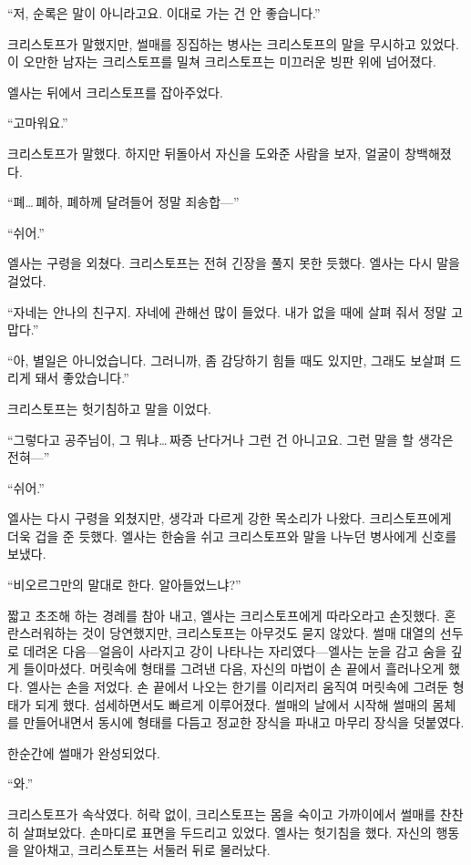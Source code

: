 ``저, 순록은 말이 아니라고요. 이대로 가는 건 안 좋습니다.''

크리스토프가 말했지만, 썰매를 징집하는 병사는 크리스토프의 말을 무시하고 있었다. 이 오만한 남자는 크리스토프를 밀쳐 크리스토프는 미끄러운 빙판 위에 넘어졌다.

엘사는 뒤에서 크리스토프를 잡아주었다.

``고마워요.''

크리스토프가 말했다. 하지만 뒤돌아서 자신을 도와준 사람을 보자, 얼굴이 창백해졌다.

``폐\ldots\,폐하, 폐하께 달려들어 정말 죄송합—''

``쉬어.''

엘사는 구령을 외쳤다. 크리스토프는 전혀 긴장을 풀지 못한 듯했다. 엘사는 다시 말을 걸었다.

``자네는 안나의 친구지. 자네에 관해선 많이 들었다. 내가 없을 때에 살펴 줘서 정말 고맙다.''

``아, 별일은 아니었습니다. 그러니까, 좀 감당하기 힘들 때도 있지만, 그래도 보살펴 드리게 돼서 좋았습니다.''

크리스토프는 헛기침하고 말을 이었다.

``그렇다고 공주님이, 그 뭐냐\ldots\,짜증 난다거나 그런 건 아니고요. 그런 말을 할 생각은 전혀—''

``쉬어.''

엘사는 다시 구령을 외쳤지만, 생각과 다르게 강한 목소리가 나왔다. 크리스토프에게 더욱 겁을 준 듯했다. 엘사는 한숨을 쉬고 크리스토프와 말을 나누던 병사에게 신호를 보냈다.

``비오르그만의 말대로 한다. 알아들었느냐?''

짧고 초조해 하는 경례를 참아 내고, 엘사는 크리스토프에게 따라오라고 손짓했다. 혼란스러워하는 것이 당연했지만, 크리스토프는 아무것도 묻지 않았다. 썰매 대열의 선두로 데려온 다음—얼음이 사라지고 강이 나타나는 자리였다—엘사는 눈을 감고 숨을 깊게 들이마셨다. 머릿속에 형태를 그려낸 다음, 자신의 마법이 손 끝에서 흘러나오게 했다. 엘사는 손을 저었다. 손 끝에서 나오는 한기를 이리저리 움직여 머릿속에 그려둔 형태가 되게 했다. 섬세하면서도 빠르게 이루어졌다. 썰매의 날에서 시작해 썰매의 몸체를 만들어내면서 동시에 형태를 다듬고 정교한 장식을 파내고 마무리 장식을 덧붙였다.

한순간에 썰매가 완성되었다.

``와.''

크리스토프가 속삭였다. 허락 없이, 크리스토프는 몸을 숙이고 가까이에서 썰매를 찬찬히 살펴보았다. 손마디로 표면을 두드리고 있었다. 엘사는 헛기침을 했다. 자신의 행동을 알아채고, 크리스토프는 서둘러 뒤로 물러났다.

